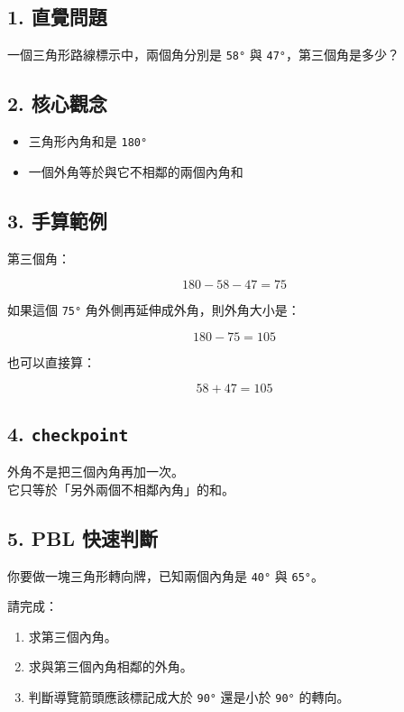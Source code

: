 \documentclass[
  chinese,
  12pt,
  a4paper,
  oneside]{article}
\providecommand{\tightlist}{%
  \setlength{\itemsep}{0pt}\setlength{\parskip}{0pt}}
\begin{document}
\subsection{1. 直覺問題}\label{ux76f4ux89baux554fux984c-3}

一個三角形路線標示中，兩個角分別是 \texttt{58°} 與
\texttt{47°}，第三個角是多少？

\subsection{2. 核心觀念}\label{ux6838ux5fc3ux89c0ux5ff5-1}

\begin{itemize}
\tightlist
\item
  三角形內角和是 \texttt{180°}
\item
  一個外角等於與它不相鄰的兩個內角和
\end{itemize}

\subsection{3. 手算範例}\label{ux624bux7b97ux7bc4ux4f8b-3}

第三個角：

\[
180 - 58 - 47 = 75
\]

如果這個 \texttt{75°} 角外側再延伸成外角，則外角大小是：

\[
180 - 75 = 105
\]

也可以直接算：

\[
58 + 47 = 105
\]

\subsection{\texorpdfstring{4.
\texttt{checkpoint}}{4. checkpoint}}\label{checkpoint-3}

外角不是把三個內角再加一次。\\
它只等於「另外兩個不相鄰內角」的和。

\subsection{5. PBL 快速判斷}\label{pbl-ux5febux901fux5224ux65b7-1}

你要做一塊三角形轉向牌，已知兩個內角是 \texttt{40°} 與 \texttt{65°}。

請完成：

\begin{enumerate}
\def\labelenumi{\arabic{enumi}.}
\tightlist
\item
  求第三個內角。
\item
  求與第三個內角相鄰的外角。
\item
  判斷導覽箭頭應該標記成大於 \texttt{90°} 還是小於 \texttt{90°} 的轉向。
\end{enumerate}
\end{document}
